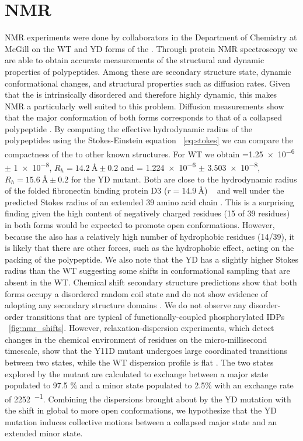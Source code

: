 \section{NMR}

NMR experiments were done by collaborators in the Department of Chemistry at McGill on the WT and YD forms of the \gct. Through protein NMR spectroscopy we are able to obtain accurate \vitro measurements of the structural and dynamic properties of polypeptides. Among these are secondary structure state, dynamic conformational changes, and structural properties such as diffusion rates. Given that the \gct is intrinsically disordered and therefore highly dynamic, this makes NMR a particularly well suited to this problem. Diffusion measurements show that the major conformation of both forms corresponds to that of a collapsed polypeptide . By computing the effective hydrodynamic radius of the polypeptides using the Stokes-Einstein equation ~\ref{eq:stokes} we can compare the compactness of the \gct to other known structures. For WT we obtain \diffusion=\num{1.25e-6} $\pm$  \SI{1e-8}{\dcunits}, $R_h = \SI{14.2}{\angstrom} \pm 0.2$ and \diffusion= \num{1.224e-6} $\pm$ \SI{3.503e-8}{\dcunits}, $R_h = \SI{15.6}{\angstrom} \pm 0.2$ for the YD mutant. Both are close to the hydrodynamic radius of the folded fibronectin binding protein D3 ($r = \SI{14.9}{\angstrom}$) ~\cite{wilkins1999hydrodynamic} and well under the predicted Stokes radius of an extended 39 amino acid chain . This is a surprising finding given the high content of negatively charged residues (15 of 39 residues) in both forms would be expected to promote open conformations. However, because the \gct also has a relatively high number of hydrophobic residues (14/39), it is likely that there are other forces, such as the hydrophobic effect, acting on the packing of the polypeptide. We also note that the YD has a slightly higher Stokes radius than the WT suggesting some shifts in conformational sampling that are absent in the WT. Chemical shift secondary structure predictions show that both forms occupy a disordered random coil state and do not show evidence of adopting any secondary structure domains . We do not observe any disorder-order transitions that are typical of functionally-coupled phosphorylated IDPs ~\ref{fig:nmr_shifts}. However, relaxation-dispersion experiments, which detect changes in the chemical environment of residues on the micro-millisecond timescale, show that the Y11D mutant undergoes large coordinated transitions between two states, while the WT dispersion profile is flat . The two states explored by the mutant are calculated to exchange between a major state populated to 97.5 \% and a minor state populated to 2.5\% with an exchange rate of \SI{2252}{\sec^{-1}}. Combining the dispersions brought about by the YD mutation with the shift in global \diffusion to more open conformations, we hypothesize that the YD mutation induces collective motions between a collapsed major state and an extended minor state. 

